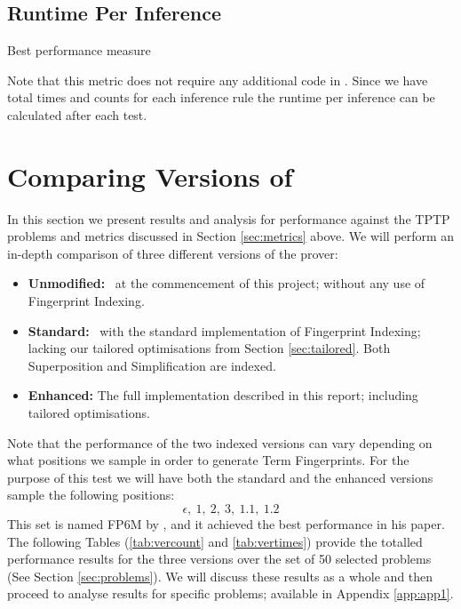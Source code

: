 \subsection{Runtime Per Inference}

Best performance measure

Note that this metric does not require any additional code in \beagle. Since we
have total times and counts for each inference rule the runtime per inference can
be calculated after each test.

\section{Comparing Versions of \Beagle}
\label{sec:indexresults}

In this section we present results and analysis for performance against the TPTP
problems and metrics discussed in Section \ref{sec:metrics} above. We will perform
an in-depth comparison of three different versions of the prover:
\begin{itemize}
\item \textbf{Unmodified:} \beagle\ at the commencement of this project; without
any use of Fingerprint Indexing.
\item \textbf{Standard:} \beagle\ with the standard implementation of Fingerprint
Indexing; lacking our tailored optimisations from Section \ref{sec:tailored}. Both
Superposition and Simplification are indexed.
\item \textbf{Enhanced:} The full implementation described in this report; including
tailored optimisations.
\end{itemize}
Note that the performance of the two indexed versions can vary depending on what
positions we sample in order to generate Term Fingerprints. For the purpose of this
test we will have both the standard and the enhanced versions sample the following
positions:
  \[\epsilon,\  1,\  2,\  3,\  1.1,\  1.2\]
This set is named FP6M by , and it achieved the best performance in
his paper. The following Tables (\ref{tab:vercount} and \ref{tab:vertimes})
provide the totalled performance results for the three versions over the set of
50 selected problems (See Section \ref{sec:problems}). We will discuss these results
as a whole and then proceed to analyse results for specific problems; available in
Appendix \ref{app:app1}.

